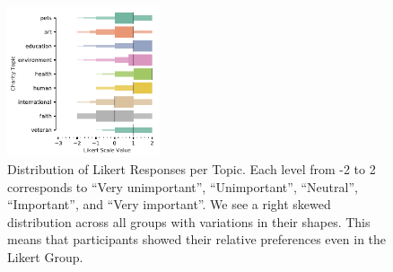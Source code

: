 

\begin{figure}[htpb]
    \centering
    \includegraphics[width=0.4\textwidth, keepaspectratio=true]{content/image/likert_distribution_per_topic.pdf}
    \caption{
      Distribution of Likert Responses per Topic. 
      Each level from -2 to 2 corresponds to 
      ``Very unimportant'', ``Unimportant'', ``Neutral'', ``Important'', and ``Very important''.
      We see a right skewed distribution across all groups with variations in their shapes.
      This means that participants showed their relative preferences even in the Likert Group.
    }
    \label{fig:likert_exp1}
\end{figure}

